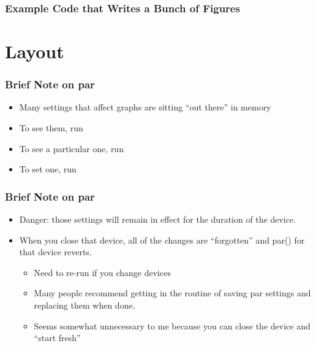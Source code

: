 \documentclass[11pt,english]{beamer}
\begin{document}

\begin{frame}
  \frametitle{Example Code that Writes a Bunch of Figures}




\end{frame}


\section{Layout}

\begin{frame}[containsverbatim]
  \frametitle{Brief Note on par}
  \begin{itemize}
  \item Many settings that affect graphs are sitting ``out there''
    in memory
  \item To see them, run

  \item To see a particular one, run

  \item To set one, run

  \end{itemize}
\end{frame}

\begin{frame}[containsverbatim]
  \frametitle{Brief Note on par}
  \begin{itemize}
  \item Danger: those settings will remain in effect for the
    duration of the device.
  \item When you close that device, all of the changes are
    ``forgotten'' and par() for that device reverts.
    \begin{itemize}
    \item Need to re-run if you change devices
    \item Many people recommend getting in the routine of saving par
      settings and replacing them when done.

    \item Seems somewhat unnecessary to me because you can close
      the device and ``start fresh''

    \end{itemize}
  \end{itemize}
\end{frame}

\end{document}
